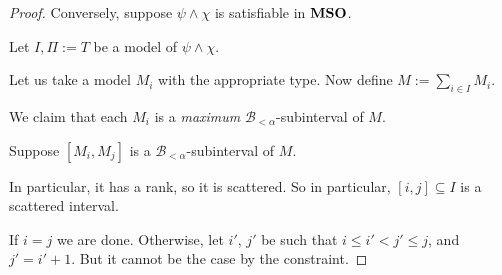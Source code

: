 \begin{proof}
  Conversely, suppose $\psi \land \chi$ is satisfiable in $\mathbf{MSO}$.

  Let $I, \Pi := T$ be a model of $\psi \land \chi$.

  Let us take a model $M_i$ with the appropriate type.
  Now define $M := \sum_{i \in I} M_i$.

  We claim that each $M_i$ is a \emph{maximum} $\mathcal{B}_{< \alpha}$-subinterval
  of $M$.

  Suppose $[M_i, M_j]$ is a $\mathcal{B}_{< \alpha}$-subinterval of $M$.
  
  In particular, it has a rank, so it is scattered. So in particular,
  $[i, j] \subseteq I$ is a scattered interval.

  If $i = j$ we are done. Otherwise, let $i'$, $j'$ be such that $i \le i' < j' \le j$,
  and $j' = i' + 1$.  But it cannot be the case by the constraint.


\end{proof}
